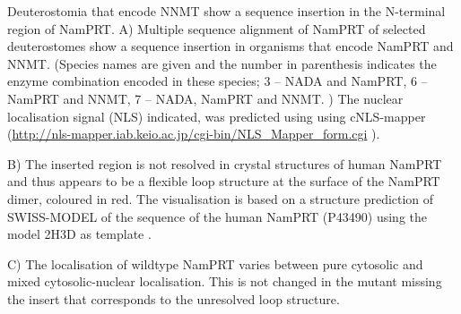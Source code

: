 Deuterostomia that encode NNMT show a sequence insertion in the N-terminal region of NamPRT. A) Multiple sequence alignment of NamPRT of selected deuterostomes show a sequence insertion in organisms that encode NamPRT and NNMT. (Species names are given and the number in parenthesis indicates the enzyme combination encoded in these species; 3 – NADA and NamPRT, 6 – NamPRT and NNMT, 7 – NADA, NamPRT and NNMT. ) The nuclear localisation signal (NLS) indicated, was predicted using using cNLS-mapper (\url{http://nls-mapper.iab.keio.ac.jp/cgi-bin/NLS_Mapper_form.cgi} \cite{Kosugi2009}).

B) The inserted region is not resolved in crystal structures of human NamPRT and thus appears to be a flexible loop structure at the surface of the NamPRT dimer, coloured in red. The visualisation is based on a structure prediction of SWISS-MODEL \cite{Arnold2006,Biasini2014} of the sequence of the human NamPRT (P43490) using the model 2H3D as template \cite{Wang2006}.

C) The localisation of wildtype NamPRT varies between pure cytosolic and mixed cytosolic-nuclear localisation. This is not changed in the mutant missing the insert that corresponds to the unresolved loop structure.
